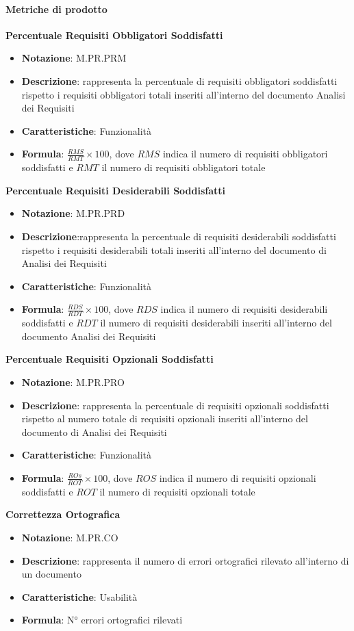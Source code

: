 \paragraph{Metriche di prodotto}
\textbf{Percentuale Requisiti Obbligatori Soddisfatti}
\begin{itemize}
    \item \textbf{Notazione}: M.PR.PRM
    \item \textbf{Descrizione}: rappresenta la percentuale di requisiti obbligatori soddisfatti rispetto i requisiti obbligatori totali inseriti all'interno del documento Analisi dei Requisiti
    \item \textbf{Caratteristiche}: Funzionalità
    \item \textbf{Formula}: $\frac{RMS}{RMT} \times 100$, dove $RMS$ indica il numero di requisiti obbligatori soddisfatti e $RMT$ il numero di requisiti obbligatori totale 
\end{itemize}
\textbf{Percentuale Requisiti Desiderabili Soddisfatti}
\begin{itemize}
    \item \textbf{Notazione}: M.PR.PRD
    \item \textbf{Descrizione}:rappresenta la percentuale di requisiti desiderabili soddisfatti rispetto i requisiti desiderabili totali inseriti all'interno del documento di Analisi dei Requisiti
    \item \textbf{Caratteristiche}: Funzionalità
    \item \textbf{Formula}: $\frac{RDS}{RDT} \times 100$, dove $RDS$ indica il numero di requisiti desiderabili soddisfatti e $RDT$ il numero di requisiti desiderabili inseriti all'interno del documento Analisi dei Requisiti
\end{itemize}
\textbf{Percentuale Requisiti Opzionali Soddisfatti}
\begin{itemize}
    \item \textbf{Notazione}: M.PR.PRO
    \item \textbf{Descrizione}: rappresenta la percentuale di requisiti opzionali soddisfatti rispetto al numero totale di requisiti opzionali inseriti all'interno del documento di Analisi dei Requisiti
    \item \textbf{Caratteristiche}: Funzionalità
    \item \textbf{Formula}: $\frac{ROs}{ROT} \times 100$, dove $ROS$ indica il numero di requisiti opzionali soddisfatti e $ROT$ il numero di requisiti opzionali totale 
\end{itemize}
\textbf{Correttezza Ortografica}
\begin{itemize}
    \item \textbf{Notazione}: M.PR.CO
    \item \textbf{Descrizione}: rappresenta il numero di errori ortografici rilevato all'interno di un documento 
    \item \textbf{Caratteristiche}: Usabilità
    \item \textbf{Formula}: N° errori ortografici rilevati
\end{itemize}

